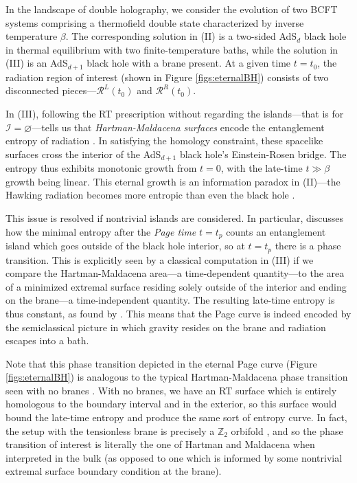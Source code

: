 \documentclass[12pt,a4paper]{article}
\begin{document}
In the landscape of double holography, we consider the evolution of two BCFT systems comprising a thermofield double state characterized by inverse temperature $\beta$. The corresponding solution in (II) is a two-sided AdS$_d$ black hole in thermal equilibrium with two finite-temperature baths, while the solution in (III) is an AdS$_{d+1}$ black hole with a brane present. At a given time $t = t_0$, the radiation region of interest (shown in Figure \ref{figs:eternalBH}) consists of two disconnected pieces---$\mathcal{R}^L(t_0)$ and $\mathcal{R}^R(t_0)$.



In (III), following the RT prescription without regarding the islands---that is for $\mathcal{I} = \varnothing$---tells us that \textit{Hartman-Maldacena surfaces} encode the entanglement entropy of radiation \cite{Hartman:2013qma}. In satisfying the homology constraint, these spacelike surfaces cross the interior of the AdS$_{d+1}$ black hole's Einstein-Rosen bridge. The entropy thus exhibits monotonic growth from $t = 0$, with the late-time $t \gg \beta$ growth being linear. This eternal growth is an information paradox in (II)---the Hawking radiation becomes more entropic than even the black hole \cite{Almheiri:2019yqk}.

This issue is resolved if nontrivial islands are considered. In particular, \cite{Almheiri:2019yqk} discusses how the minimal entropy after the \textit{Page time} $t = t_p$ counts an entanglement island which goes outside of the black hole interior, so at $t = t_p$ there is a phase transition. This is explicitly seen by a classical computation in (III) if we compare the Hartman-Maldacena area---a time-dependent quantity---to the area of a minimized extremal surface residing solely outside of the interior and ending on the brane---a time-independent quantity. The resulting late-time entropy is thus constant, as found by \cite{Almheiri:2019yqk}. This means that the Page curve is indeed encoded by the semiclassical picture in which gravity resides on the brane and radiation escapes into a bath.

Note that this phase transition depicted in the eternal Page curve (Figure \ref{figs:eternalBH}) is analogous to the typical Hartman-Maldacena phase transition seen with no branes \cite{Hartman:2013qma}. With no branes, we have an RT surface which is entirely homologous to the boundary interval and in the exterior, so this surface would bound the late-time entropy and produce the same sort of entropy curve. In fact, the setup with the tensionless brane is precisely a $\mathbb{Z}_2$ orbifold \cite{Shashi:2020mkd,Geng:2020qvw}, and so the phase transition of interest is literally the one of Hartman and Maldacena when interpreted in the bulk (as opposed to one which is informed by some nontrivial extremal surface boundary condition at the brane).
\end{document}
